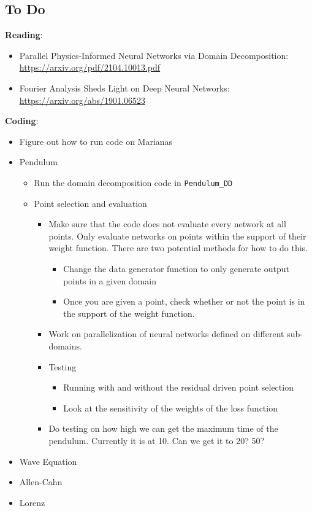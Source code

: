 \documentclass{article}
\def\bf{\textbf}
\begin{document}
\subsection*{To Do}
\bf{Reading}:
\begin{itemize}
	\item Parallel Physics-Informed Neural Networks via Domain Decomposition: \url{https://arxiv.org/pdf/2104.10013.pdf}
	\item Fourier Analysis Sheds Light on Deep Neural Networks: \url{https://arxiv.org/abs/1901.06523}
\end{itemize}
\bf{Coding}:
\begin{itemize}
\item Figure out how to run code on Marianas
	\item Pendulum
	\begin{itemize}
		\item Run the domain decomposition code in \verb|Pendulum_DD|
		\item Point selection and evaluation
		\begin{itemize}
			\item Make sure that the code does not evaluate every network at all points. Only evaluate networks on points within the support of their weight function. There are two potential methods for how to do this.
			\begin{itemize}
				\item Change the data generator function to only generate output points in a given domain 
				\item Once you are given a point, check whether or not the point is in the support of the weight function.
			\end{itemize}
			\item Work on parallelization of neural networks defined on different sub-domains.
			\item Testing
			\begin{itemize}
				\item Running with and without the residual driven point selection
				\item Look at the sensitivity of the weights of the loss function
			\end{itemize}
			\item Do testing on how high we can get the maximum time of the pendulum. Currently it is at 10. Can we get it to 20? 50?
		\end{itemize}
	\end{itemize}
	\item Wave Equation
	\item Allen-Cahn
	\item Lorenz
\end{itemize}
\newpage
\newpage
\end{document}
